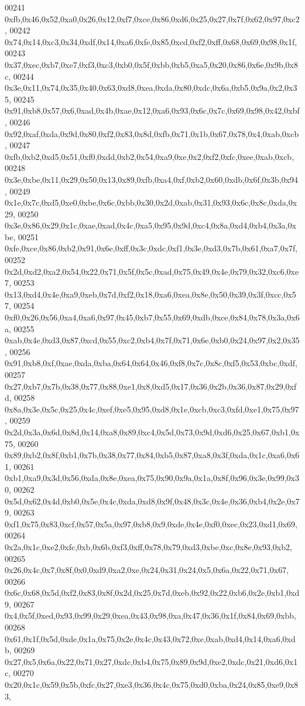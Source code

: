 \begin{DoxyCode}
00241   0xfb,0x46,0x52,0xa0,0x26,0x12,0xf7,0xce,0x86,0xd6,0x25,0x27,0x7f,0x62,0x97,0xc2,
00242   0x74,0x14,0xc3,0x34,0xdf,0x14,0xa6,0xfe,0x85,0xcd,0xf2,0xff,0x68,0x69,0x98,0x1f,
00243   0x37,0xec,0xb7,0xe7,0xf3,0xc3,0xb0,0x5f,0xbb,0xb5,0xa5,0x20,0x86,0x6e,0x9b,0x8c,
00244   0x3e,0x11,0x74,0x35,0x40,0x63,0xd8,0xea,0xda,0x80,0xdc,0x6a,0xb5,0x9a,0x2,0x35,
00245   0x91,0xb8,0x57,0x6,0xad,0x4b,0xae,0x12,0xa6,0x93,0x6c,0x7c,0x69,0x98,0x42,0xbf,
00246   0x92,0xaf,0xda,0x9d,0x80,0xf2,0x83,0x8d,0xfb,0x71,0x1b,0x67,0x78,0x4,0xab,0xcb,
00247   0xfb,0xb2,0xd5,0x51,0xf0,0xdd,0xb2,0x54,0xa9,0xe,0x2,0xf2,0xfc,0xee,0xab,0xcb,
00248   0x3e,0xbe,0x11,0x29,0x50,0x13,0x89,0xfb,0xa4,0xf,0xb2,0x60,0xdb,0x6f,0x3b,0x94,
00249   0x1e,0x7c,0xd5,0xe0,0xbe,0x6c,0xbb,0x30,0x2d,0xab,0x31,0x93,0x6c,0x8c,0xda,0x29,
00250   0x3e,0x86,0x29,0x1c,0xae,0xad,0x4c,0xa5,0x95,0x9d,0xc4,0x8a,0xd4,0xb4,0x3a,0xbe,
00251   0xfe,0xce,0x86,0xb2,0x91,0x6e,0xff,0x3c,0xdc,0xf1,0x3e,0xd3,0x7b,0x61,0xa7,0x7f,
00252   0x2d,0xd2,0xa2,0x54,0x22,0x71,0x5f,0x5c,0xad,0x75,0x49,0x4e,0x79,0x32,0xc6,0xe7,
00253   0x13,0xd4,0x4e,0xa9,0xeb,0x7d,0xf2,0x18,0xa6,0xea,0x8e,0x50,0x39,0x3f,0xcc,0x57,
00254   0xf0,0x26,0x56,0xa4,0xa6,0x97,0x45,0xb7,0x55,0x69,0xdb,0xce,0x84,0x78,0x3a,0x6a,
00255   0xab,0x4e,0xd3,0x87,0xcd,0x55,0xc2,0xb4,0x7f,0x71,0x6e,0xb0,0x24,0x97,0x2,0x35,
00256   0x91,0xb8,0xf,0xae,0xda,0xba,0x64,0x64,0x46,0xf8,0x7c,0x8c,0xf5,0x53,0xbc,0xdf,
00257   0x27,0xb7,0x7b,0x38,0x77,0x88,0xe1,0x8,0xd5,0x17,0x36,0x2b,0x36,0x87,0x29,0xfd,
00258   0x8a,0x3e,0x5c,0x25,0x4c,0xef,0xe5,0x95,0xd8,0x1e,0xcb,0xc3,0xfd,0xe1,0x75,0x97,
00259   0x2d,0x3a,0x6d,0x8d,0x14,0xa8,0x89,0xc4,0x5d,0x73,0x9d,0xd6,0x25,0x67,0xb1,0x75,
00260   0x89,0xb2,0x8f,0xb1,0x7b,0x38,0x77,0x84,0xb5,0x87,0xa8,0x3f,0xda,0x1c,0xa6,0x61,
00261   0xb1,0xa9,0x3d,0x56,0xda,0x8e,0xea,0x75,0x90,0x9a,0x1a,0x8f,0x96,0x3e,0x99,0x30,
00262   0x5d,0x62,0x4d,0xb0,0x5e,0x4c,0xda,0xd8,0x9f,0x48,0x3c,0x4e,0x36,0xb4,0x2e,0x79,
00263   0xf1,0x75,0x83,0xcf,0x57,0x5a,0x97,0xb8,0x9,0xde,0x4e,0xf0,0xec,0x23,0xd1,0x69,
00264   0x2a,0x1c,0xe2,0xfc,0xb,0x6b,0xf3,0xff,0x78,0x79,0xd3,0xbe,0xc,0x8e,0x93,0xb2,
00265   0x26,0x4c,0x7,0x8f,0x0,0xd9,0xa2,0xe,0x24,0x31,0x24,0x5,0x6a,0x22,0x71,0x67,
00266   0x6c,0x68,0x5d,0xf2,0x83,0x8f,0x2d,0x25,0x7d,0xeb,0x92,0x22,0xb6,0x2e,0xb1,0xd9,
00267   0x4,0x5f,0xed,0x93,0x99,0x29,0xea,0x43,0x98,0xa,0x47,0x36,0x1f,0x84,0x69,0xbb,
00268   0x61,0x1f,0x5d,0xde,0x1a,0x75,0x2e,0x4c,0x43,0x72,0xe,0xab,0xd4,0x14,0xa6,0xdb,
00269   0x27,0x5,0x6a,0x22,0x71,0x27,0xdc,0xb4,0x75,0x89,0x9d,0xe2,0xdc,0x21,0xd6,0x1c,
00270   0x20,0x1c,0x59,0x5b,0xfc,0x27,0xe3,0x36,0x4c,0x75,0xd0,0xba,0x24,0x85,0xe9,0x83,

\end{DoxyCode}
